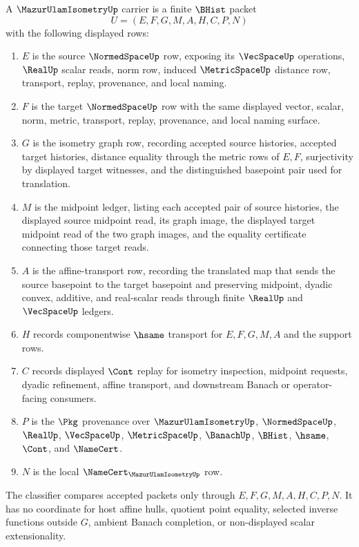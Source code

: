 \begin{definition}
\label{def:mazur-ulam-isometry-carrier}
A $\MazurUlamIsometryUp$ carrier is a finite $\BHist$ packet
$$
U=(E,F,G,M,A,H,C,P,N)
$$
with the following displayed rows:
\begin{enumerate}
\item $E$ is the source $\NormedSpaceUp$ row, exposing its $\VecSpaceUp$ operations, $\RealUp$ scalar reads, norm row, induced $\MetricSpaceUp$ distance row, transport, replay, provenance, and local naming.
\item $F$ is the target $\NormedSpaceUp$ row with the same displayed vector, scalar, norm, metric, transport, replay, provenance, and local naming surface.
\item $G$ is the isometry graph row, recording accepted source histories, accepted target histories, distance equality through the metric rows of $E,F$, surjectivity by displayed target witnesses, and the distinguished basepoint pair used for translation.
\item $M$ is the midpoint ledger, listing each accepted pair of source histories, the displayed source midpoint read, its graph image, the displayed target midpoint read of the two graph images, and the equality certificate connecting those target reads.
\item $A$ is the affine-transport row, recording the translated map that sends the source basepoint to the target basepoint and preserving midpoint, dyadic convex, additive, and real-scalar reads through finite $\RealUp$ and $\VecSpaceUp$ ledgers.
\item $H$ records componentwise $\hsame$ transport for $E,F,G,M,A$ and the support rows.
\item $C$ records displayed $\Cont$ replay for isometry inspection, midpoint requests, dyadic refinement, affine transport, and downstream Banach or operator-facing consumers.
\item $P$ is the $\Pkg$ provenance over $\MazurUlamIsometryUp$, $\NormedSpaceUp$, $\RealUp$, $\VecSpaceUp$, $\MetricSpaceUp$, $\BanachUp$, $\BHist$, $\hsame$, $\Cont$, and $\NameCert$.
\item $N$ is the local $\NameCert_{\MazurUlamIsometryUp}$ row.
\end{enumerate}
The classifier compares accepted packets only through $E,F,G,M,A,H,C,P,N$. It has no coordinate for host affine hulls, quotient point equality, selected inverse functions outside $G$, ambient Banach completion, or non-displayed scalar extensionality.
\end{definition}

